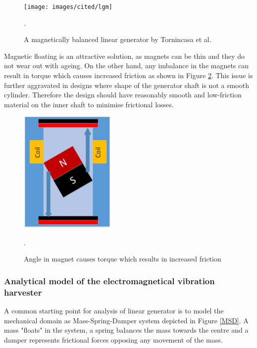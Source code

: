 \begin{figure}[htb]
\begin{center}
\texttt{[image: images/cited/lgm]}
\end{center}
\caption{A magnetically balanced linear generator by Tornincasa et al. \cite{Tornincasa2012}}.
\label{lgm}
\end{figure}

Magnetic floating is an attractive solution, as magnets can be thin and they do not wear out with ageing. On the other hand, any imbalance in the magnets can result in torque which causes increased friction as shown in Figure \ref{fig:lg_torgue}. This issue is further aggravated in designs where shape of the generator shaft is not a smooth cylinder. Therefore the design should have reasonably smooth and low-friction material on the inner shaft to minimise frictional losses.

\begin{figure}[htb]
\begin{center}
\includegraphics[height=6cm]{images/own_dwg/generator_torgue}
\end{center}
\caption{Angle in magnet causes torque which results in increased friction}.
\label{fig:lg_torgue}
\end{figure}



\subsubsection{Analytical model of the electromagnetical vibration harvester}
A common starting point for analysis of linear generator is to model the mechanical domain as Mass-Spring-Damper system depicted in Figure \ref{MSD}. A mass "floats" in the system, a spring balances the mass towards the centre and a damper represents frictional forces opposing any movement of the mass. 

